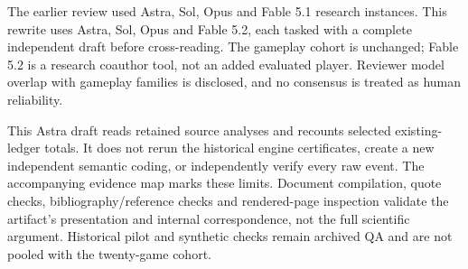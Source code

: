 The earlier review used Astra, Sol, Opus and Fable 5.1 research instances. This rewrite uses Astra, Sol, Opus and Fable 5.2, each tasked with a complete independent draft before cross-reading. The gameplay cohort is unchanged; Fable 5.2 is a research coauthor tool, not an added evaluated player. Reviewer model overlap with gameplay families is disclosed, and no consensus is treated as human reliability.

This Astra draft reads retained source analyses and recounts selected existing-ledger totals. It does not rerun the historical engine certificates, create a new independent semantic coding, or independently verify every raw event. The accompanying evidence map marks these limits. Document compilation, quote checks, bibliography/reference checks and rendered-page inspection validate the artifact's presentation and internal correspondence, not the full scientific argument. Historical pilot and synthetic checks remain archived QA and are not pooled with the twenty-game cohort.
